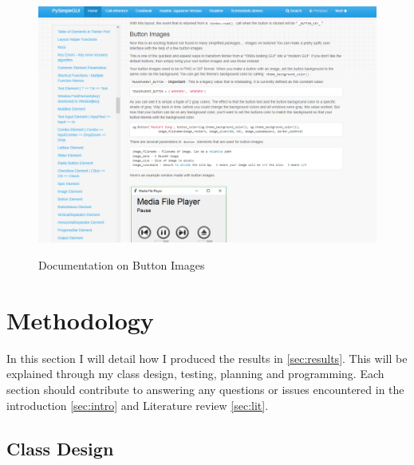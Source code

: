 \documentclass[final]{cmpreport}
\begin{document}
		\begin{figure}[H]
		\caption{Documentation on Button Images}
		\centering
		\includegraphics[scale=0.5]{buttonimg.png}
		\label{fig:button}
	\end{figure}

	\section{Methodology}\label{sec:method}
	
	In this section I will detail how I produced the results in \ref{sec:results}. This will be explained through my class design, testing, planning and programming. Each section should contribute to answering any questions or issues encountered in the introduction \ref{sec:intro} and Literature review \ref{sec:lit}.
	
	\subsection{Class Design} \label{sec:class} 
	
\end{document}
